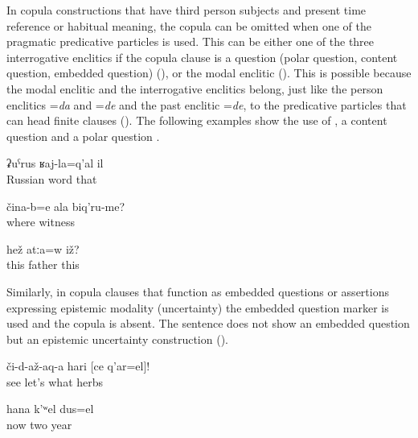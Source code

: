 In copula constructions that have third person subjects and present time reference or habitual meaning, the copula can be omitted when one of the pragmatic predicative particles is used. This can be either one of the three interrogative enclitics if the copula clause is a question (polar question, content question, embedded question) (), or the modal enclitic  (). This is possible because the modal enclitic and the interrogative enclitics belong, just like the person enclitics =\textit{da} and =\textit{de} and the past enclitic =\textit{de}, to the predicative particles that can head finite clauses (). The following examples show the use of  , a content question  and a polar question .
%
\begin{exe}
	\ex	\label{ex:‎That is a Russian word}
	\gll	ʡuˁrus	ʁaj-la=q'al	il\\
		Russian	word	that	\\
	\glt	{}

	\ex	\label{ex:Where are your witnesses}
	\gll	čina-b=e	ala	biq'ru-me?\\
		where		witness\\
	\glt	{}

	\ex	\label{ex:Is this the father}
	\gll	hež	atːa=w	iž?\\
		this	father	this\\
	\glt	{}
\end{exe}

Similarly, in copula clauses that function as embedded questions or assertions expressing epistemic modality (uncertainty) the embedded question marker is used  and the copula is absent. The sentence  does not show an embedded question but an epistemic uncertainty construction ().
%
\begin{exe}
	\ex	\label{ex:‎Show what herbs these are}
	\gll	či-d-až-aq-a	hari	[ce	q'ar=el]!\\
		see	let's	what	herbs\\
	\glt	{}

	\ex	\label{ex:Now it is probably two years (that have passed by)}
	\gll	hana	k'ʷel	dus=el\\
		now	two	year\\
	\glt	{}
\end{exe}

